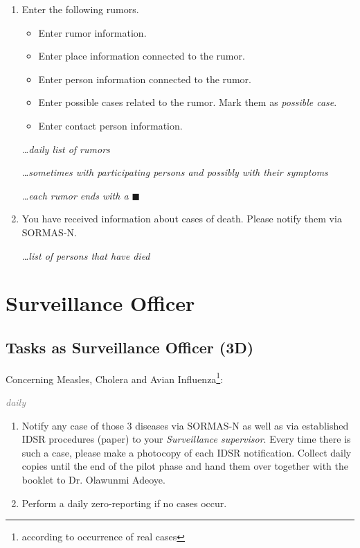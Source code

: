 \documentclass[a4paper, titlepage]{tufte-handout}
\begin{document}
\begin{enumerate}
\item Enter the following rumors.

\begin{itemize}
\item Enter rumor information.

\item Enter place information connected to the rumor.

\item Enter person information connected to the rumor.

\item Enter possible cases related to the rumor. Mark them as \emph{possible case}.

\item Enter contact person information.
\end{itemize}

\emph{\ldots daily list of rumors}

\emph{\ldots sometimes with participating persons and possibly with their symptoms}

\emph{\ldots each rumor ends with a $\blacksquare$}

\item You have received information about cases of death. Please notify them via SORMAS-N.

\emph{\ldots list of persons that have died}
\end{enumerate}

\section{Surveillance Officer}
\label{sec-4}

\subsection{Tasks as Surveillance Officer (3D)}
\label{sec-4-1}

Concerning Measles, Cholera and Avian Influenza\footnote{according to occurrence of real cases}:

\emph{\textcolor{gray}{daily}}

\begin{enumerate}
\item Notify any case of those 3 diseases via SORMAS-N as well as via established IDSR procedures (paper) to your \emph{Surveillance supervisor}. Every time there is such a case, please make a photocopy of each IDSR notification. Collect daily copies until the end of the pilot phase and hand them over together with the booklet to Dr. Olawunmi Adeoye.

\item Perform a daily zero-reporting if no cases occur.
\end{enumerate}
\end{document}
